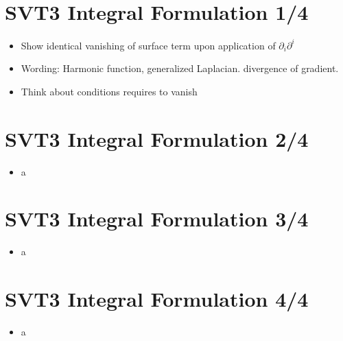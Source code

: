 \documentclass[10pt,letterpaper]{article}
\numberwithin{equation}{section}
\begin{document}
\section{SVT3 Integral Formulation 1/4}
\begin{itemize}
	\item Show identical vanishing of surface term upon application of $\partial_i \partial^i$
	\item Wording: Harmonic function, generalized  Laplacian. divergence of gradient. 
	\item Think about conditions requires to vanish
\end{itemize}

\section{SVT3 Integral Formulation 2/4}
\begin{itemize}
	\item a
\end{itemize}


\section{SVT3 Integral Formulation 3/4}
\begin{itemize}
	\item a
\end{itemize}


\section{SVT3 Integral Formulation 4/4}
\begin{itemize}
	\item a
\end{itemize}

\end{document}

